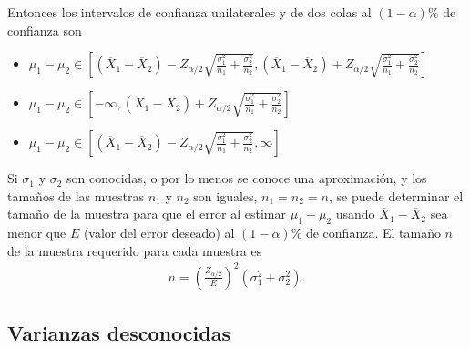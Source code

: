 Entonces los intervalos de confianza unilaterales y de dos colas al $\left(1-\alpha\right)\%$ de confianza son 







\begin{itemize}
\item $\mu_{1}-\mu_{2}\in \left[\left(\overline{X}_{1}-\overline{X}_{2}\right)-Z_{\alpha/2}\sqrt{\frac{\sigma_{1}^{2}}{n_{1}}+\frac{\sigma_{2}^{2}}{n_{2}}},\left(\overline{X}_{1}-\overline{X}_{2}\right)+Z_{\alpha/2}\sqrt{\frac{\sigma_{1}^{2}}{n_{1}}+\frac{\sigma_{2}^{2}}{n_{2}}}\right]$

\item $\mu_{1}-\mu_{2}\in \left[-\infty,\left(\overline{X}_{1}-\overline{X}_{2}\right)+Z_{\alpha/2}\sqrt{\frac{\sigma_{1}^{2}}{n_{1}}+\frac{\sigma_{2}^{2}}{n_{2}}}\right]$

\item $\mu_{1}-\mu_{2}\in \left[\left(\overline{X}_{1}-\overline{X}_{2}\right)-Z_{\alpha/2}\sqrt{\frac{\sigma_{1}^{2}}{n_{1}}+\frac{\sigma_{2}^{2}}{n_{2}}},\infty\right]$

\end{itemize}








\begin{Note}
Si $\sigma_{1}$ y $\sigma_{2}$ son conocidas, o por lo menos se conoce una aproximaci\'on, y los tama\~nos de las muestras $n_{1}$ y $n_{2}$ son iguales, $n_{1}=n_{2}=n$, se puede determinar el tama\~no de la muestra para que el error al estimar $\mu_{1}-\mu_{2}$ usando $\overline{X}_{1}-\overline{X}_{2}$ sea menor que $E$ (valor del error deseado) al $\left(1-\alpha\right)\%$ de confianza. El tama\~no $n$ de la muestra requerido para cada muestra es
\begin{eqnarray*}
n=\left(\frac{Z_{\alpha/2}}{E}\right)^{2}\left(\sigma_{1}^{2}+\sigma_{2}^{2}\right).
\end{eqnarray*}

\end{Note}





\subsection*{Varianzas desconocidas}






